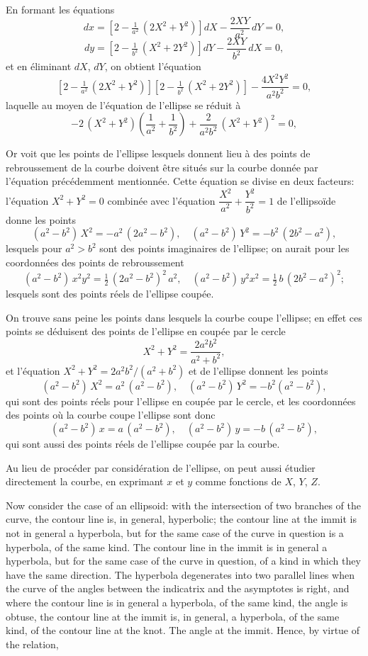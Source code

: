 \documentclass[11pt,a4paper]{book}
\begin{document}
En formant les équations
\[
dx = \left[2 - \tfrac{1}{a^2}\,(2X^2+Y^2)\right]dX - \frac{2XY}{a^2}\,dY = 0,
\]
\[
dy = \left[2 - \tfrac{1}{b^2}\,(X^2+2Y^2)\right]dY - \frac{2XY}{b^2}\,dX = 0,
\]
et en éliminant $dX$, $dY$, on obtient l'équation
\[
\left[2 - \tfrac{1}{a^2}\,(2X^2+Y^2)\right]\left[2 - \tfrac{1}{b^2}\,(X^2+2Y^2)\right] - \frac{4X^2Y^2}{a^2b^2} = 0,
\]
laquelle au moyen de l'équation de l'ellipse se réduit à
\[
- 2\,(X^2 + Y^2)\left(\frac{1}{a^2} + \frac{1}{b^2}\right) + \frac{2}{a^2b^2}\,(X^2+Y^2)^2 = 0,
\]

\setcounter{page}{125}

Or voit que les points de l'ellipse lesquels donnent lieu à des points de rebroussement de la courbe doivent être situés sur la courbe donnée par l'équation précédemment mentionnée. Cette équation se divise en deux facteurs: l'équation $X^2 + Y^2 = 0$ combinée avec l'équation $\dfrac{X^2}{a^2} + \dfrac{Y^2}{b^2} = 1$ de l'ellipsoïde donne les points
\[
(a^2-b^2)\,X^2 = -a^2\,(2a^2-b^2),\quad (a^2-b^2)\,Y^2 = -b^2\,(2b^2-a^2),
\]
lesquels pour $a^2 > b^2$ sont des points imaginaires de l'ellipse; on aurait pour les coordonnées des points de rebroussement
\[
(a^2-b^2)\,x^2y^2 = \tfrac{1}{2}\,(2a^2-b^2)^2\,a^2,\quad (a^2-b^2)\,y^2x^2 = \tfrac{1}{2}\,b\,(2b^2-a^2)^2;
\]
lesquels sont des points réels de l'ellipse coupée.

On trouve sans peine les points dans lesquels la courbe coupe l'ellipse; en effet ces points se déduisent des points de l'ellipse en coupée par le cercle
\[
X^2 + Y^2 = \frac{2a^2b^2}{a^2+b^2},
\]
et l'équation $X^2 + Y^2 = 2a^2b^2/(a^2+b^2)$ et de l'ellipse donnent les points
\[
(a^2-b^2)\,X^2 = a^2\,(a^2-b^2),\quad (a^2-b^2)\,Y^2 = -b^2(a^2-b^2),
\]
qui sont des points réels pour l'ellipse en coupée par le cercle, et les coordonnées des points où la courbe coupe l'ellipse sont donc
\[
(a^2-b^2)\,x = a\,(a^2-b^2),\quad (a^2-b^2)\,y = -b\,(a^2-b^2),
\]
qui sont aussi des points réels de l'ellipse coupée par la courbe.

Au lieu de procéder par considération de l'ellipse, on peut aussi étudier directement la courbe, en exprimant $x$ et $y$ comme fonctions de $X$, $Y$, $Z$.

\setcounter{page}{126}

Now consider the case of an ellipsoid: with the intersection of two branches of the curve, the contour line is, in general, hyperbolic; the contour line at the immit is not in general a hyperbola, but for the same case of the curve in question is a hyperbola, of the same kind. The contour line in the immit is in general a hyperbola, but for the same case of the curve in question, of a kind in which they have the same direction. The hyperbola degenerates into two parallel lines when the curve of the angles between the indicatrix and the asymptotes is right, and where the contour line is in general a hyperbola, of the same kind, the angle is obtuse, the contour line at the immit is, in general, a hyperbola, of the same kind, of the contour line at the knot. The angle at the immit. Hence, by virtue of the relation,
\end{document}
